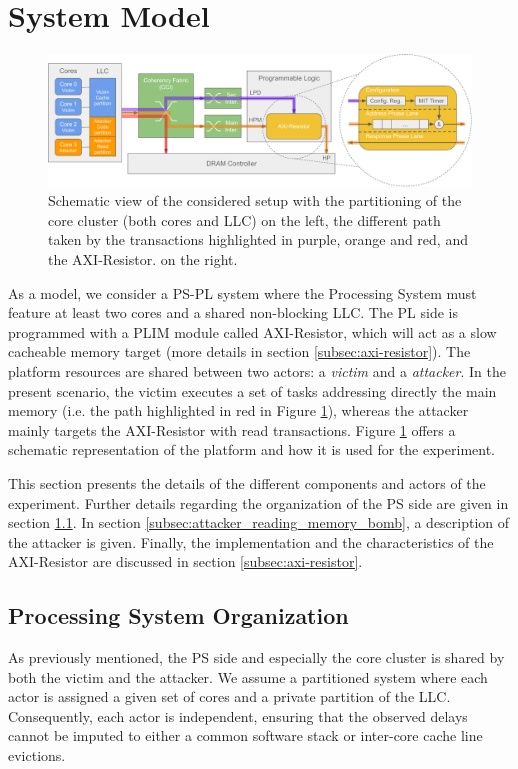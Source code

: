 \section{System Model}
    \label{sec:system_model}
    \begin{figure}
        \centering
        \includegraphics[scale=0.56]{images/Evaluation_setup.pdf}
        \caption{Schematic view of the considered setup with the partitioning of the core cluster (both cores and LLC) on the left, the different path taken by the transactions highlighted in purple, orange and red, and the AXI-Resistor. on the right.}
        \label{fig:system_schematic}
    \end{figure}

    As a model, we consider a PS-PL system where the Processing System must feature at least two cores and a shared non-blocking LLC.
    The PL side is programmed with a PLIM module called AXI-Resistor, which will act as a slow cacheable memory target (more details in section \ref{subsec:axi-resistor}).
    The platform resources are shared between two actors: a \emph{victim} and a \emph{attacker}.
    In the present scenario, the victim executes a set of tasks addressing directly the main memory (i.e. the path highlighted in red in Figure \ref{fig:system_schematic}), whereas the attacker mainly targets the AXI-Resistor with read transactions.
    Figure \ref{fig:system_schematic} offers a schematic representation of the platform and how it is used for the experiment.

    This section presents the details of the different components and actors of the experiment.
    Further details regarding the organization of the PS side are given in section \ref{subsec:processing_system_organization}.
    In section \ref{subsec:attacker_reading_memory_bomb}, a description of the attacker is given.
    Finally, the implementation and the characteristics of the AXI-Resistor are discussed in section \ref{subsec:axi-resistor}.

    \subsection{Processing System Organization}
        \label{subsec:processing_system_organization}
        As previously mentioned, the PS side and especially the core cluster is shared by both the victim and the attacker.
        We assume a partitioned system where each actor is assigned a given set of cores and a private partition of the LLC.
        Consequently, each actor is independent, ensuring that the observed delays cannot be imputed to either a common software stack or inter-core cache line evictions.

